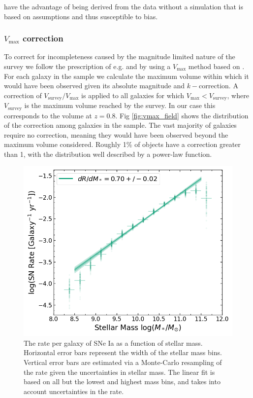 \documentclass[fleqn,usenatbib]{mnras}
\begin{document}
have the advantage of being derived from the data without a simulation that is based on assumptions and thus susceptible to bias.

\subsubsection{$V_{\mathrm{max}}$ correction \label{subsubsec:vmax_corr}}

To correct for incompleteness caused by the magnitude limited nature of the survey we follow the prescription of e.g. \citet{Sullivan2006} and \citet{Smith2012} by using a $V_{\mathrm{max}}$ method based on \citet{Schmidt1968}. For each galaxy in the sample we calculate the maximum volume within which it would have been observed given its absolute magnitude and $k-$correction. A correction of $V_{\mathrm{survey}}/V_{\mathrm{max}}$ is applied to all galaxies for which $V_{\mathrm{max}} < V_{\mathrm{survey}}$, where $V_{\mathrm{survey}}$ is the maximum volume reached by the survey. In our case this corresponds to the volume at $z=0.8$. Fig \ref{fig:vmax_field} shows the distribution of the correction among galaxies in the sample. The vast majority of galaxies require no correction, meaning they would have been observed beyond the maximum volume considered. Roughly 1\% of objects have a correction greater than 1, with the distribution well described by a power-law function.



\begin{figure}
    \centering
    \includegraphics[width=.5\textwidth]{figs/rate_vs_mass_all.png}
    \caption{The rate per galaxy of SNe Ia as a function of stellar mass. Horizontal error bars represent the width of the stellar mass bins. Vertical error bars are estimated via a Monte-Carlo resampling of the rate given the uncertainties in stellar mass. The linear fit is based on all but the lowest and highest mass bins, and takes into account uncertainties in the rate.}%
    \label{fig:rate_raw}
\end{figure}
\end{document}
